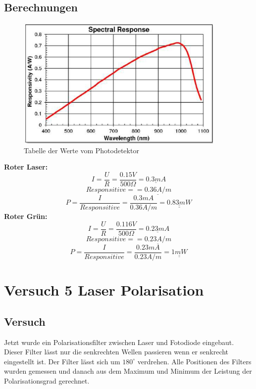 \documentclass{article}
\begin{document}
 \subsection{Berechnungen}
 \begin{figure}[H]
 	\centering
 	\includegraphics[width=0.9\textwidth]{SR}
 	\caption{Tabelle der Werte vom Photodetektor}
 \end{figure}
\newpage
\textbf{Roter Laser:}
\begin{equation}
I = \frac{U}{R}=\frac{0.15V}{500\Omega}= \underline{0.3mA} 
\end{equation}
\begin{equation}
Responsitive = = \underline{0.36A/m}
\end{equation}
\begin{equation}
P = \frac{I}{Responsitive}= \frac{0.3mA}{0.36A/m}= \underline{\underline{0.83mW}}
\end{equation}
\textbf{Roter Grün:}
\begin{equation}
I = \frac{U}{R}=\frac{0.116V}{500\Omega}= \underline{0.23mA} 
\end{equation}
\begin{equation}
Responsitive = = \underline{0.23A/m}
\end{equation}
\begin{equation}
P = \frac{I}{Responsitive}= \frac{0.23mA}{0.23A/m}= \underline{\underline{1mW}}
\end{equation}
\section{Versuch 5 Laser Polarisation}
\subsection{Versuch}
Jetzt wurde ein Polarisationsfilter zwischen Laser und Fotodiode eingebaut. Dieser Filter lässt nur die
senkrechten Wellen passieren wenn er senkrecht eingestellt ist. Der Filter lässt sich um $180^\circ$ verdrehen.
Alle Positionen des Filters wurden gemessen und danach aus dem Maximum und Minimum der
Leistung der Polarisationsgrad gerechnet.
\end{document}
